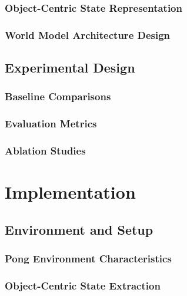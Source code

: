 \documentclass[
	english,
	ruledheaders=section,
	class=report,
	thesis={type=master},
	accentcolor=9c,
	custommargins=true,
	marginpar=false,
	parskip=half-,
	fontsize=11pt,
]{tudapub}
\begin{document}
\subsection{Object-Centric State Representation}
\label{subsec:state_representation}

\subsection{World Model Architecture Design}
\label{subsec:architecture_design}

\section{Experimental Design}
\label{sec:experimental_design}

\subsection{Baseline Comparisons}
\label{subsec:baselines}

\subsection{Evaluation Metrics}
\label{subsec:metrics}

\subsection{Ablation Studies}
\label{subsec:ablation}

\chapter{Implementation}
\label{chap:implementation}

\section{Environment and Setup}
\label{sec:environment}

\subsection{Pong Environment Characteristics}
\label{subsec:pong_characteristics}

\subsection{Object-Centric State Extraction}
\label{subsec:state_extraction}
\end{document}
